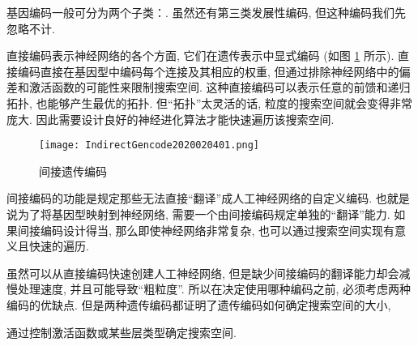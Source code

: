 基因编码一般可分为两个子类：.
虽然还有第三类发展性编码, 但这种编码我们先忽略不计.

 直接编码表示神经网络的各个方面, 它们在遗传表示中显式编码 (如图 \ref{IndirectGencode2020020401} 所示).
直接编码直接在基因型中编码每个连接及其相应的权重, 但通过排除神经网络中的偏差和激活函数的可能性来限制搜索空间.
这种直接编码可以表示任意的前馈和递归拓扑, 也能够产生最优的拓扑. 但“拓扑”太灵活的话, 粒度的搜索空间就会变得非常庞大.
因此需要设计良好的神经进化算法才能快速遍历该搜索空间.
\begin{figure}[H]
    \centering
    \texttt{[image: IndirectGencode2020020401.png]}
    \caption{间接遗传编码}
    \label{IndirectGencode2020020401}
\end{figure}

 间接编码的功能是规定那些无法直接“翻译”成人工神经网络的自定义编码.
也就是说为了将基因型映射到神经网络, 需要一个由间接编码规定单独的“翻译”能力.
如果间接编码设计得当, 那么即使神经网络非常复杂, 也可以通过搜索空间实现有意义且快速的遍历.

虽然可以从直接编码快速创建人工神经网络, 但是缺少间接编码的翻译能力却会减慢处理速度, 并且可能导致“粗粒度”.
所以在决定使用哪种编码之前, 必须考虑两种编码的优缺点.
但是两种遗传编码都证明了遗传编码如何确定搜索空间的大小,
\begin{example}
    通过控制激活函数或某些层类型确定搜索空间.
\end{example}


